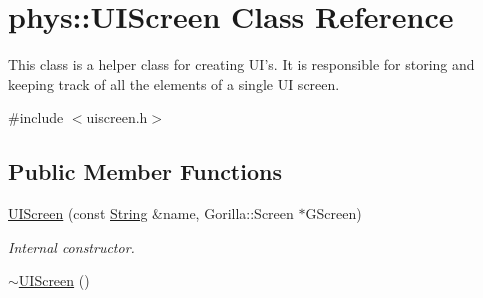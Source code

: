 \hypertarget{classphys_1_1UIScreen}{
\section{phys::UIScreen Class Reference}
\label{d9/de8/classphys_1_1UIScreen}
}


This class is a helper class for creating UI's. It is responsible for storing and keeping track of all the elements of a single UI screen.  




{\ttfamily \#include $<$uiscreen.h$>$}

\subsection*{Public Member Functions}
\begin{DoxyCompactItemize}
\item 
\hyperlink{classphys_1_1UIScreen_a721e1743b3f09e0112ff512d2888737c}{UIScreen} (const \hyperlink{namespacephys_aa03900411993de7fbfec4789bc1d392e}{String} \&name, Gorilla::Screen $\ast$GScreen)
\begin{DoxyCompactList}\small\item\em Internal constructor. \item\end{DoxyCompactList}\item 
\hypertarget{classphys_1_1UIScreen_a5b8d4ebcffefeac1b39b6dac5a51b650}{
\hyperlink{classphys_1_1UIScreen_a5b8d4ebcffefeac1b39b6dac5a51b650}{$\sim$UIScreen} ()}
\label{d9/de8/classphys_1_1UIScreen_a5b8d4ebcffefeac1b39b6dac5a51b650}


\end{DoxyCompactItemize}
